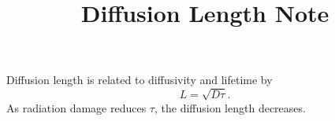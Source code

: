 \documentclass[11pt]{article}
\title{Diffusion Length Note}
\begin{document}
\maketitle

Diffusion length is related to diffusivity and lifetime by
\[
L = \sqrt{D\tau}.
\]
As radiation damage reduces $\tau$, the diffusion length decreases.
\end{document}
